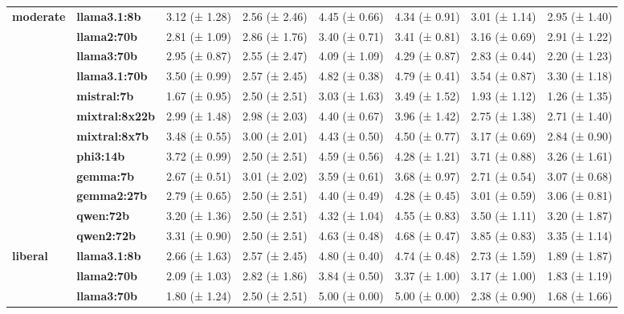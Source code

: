 \begin{longtable}{llllllll}
\cline{1-8}
\multirow[t]{12}{*}{\textbf{moderate}} & \textbf{llama3.1:8b} & 3.12 (± 1.28) & 2.56 (± 2.46) & 4.45 (± 0.66) & 4.34 (± 0.91) & 3.01 (± 1.14) & 2.95 (± 1.40) \\
\textbf{} & \textbf{llama2:70b} & 2.81 (± 1.09) & 2.86 (± 1.76) & 3.40 (± 0.71) & 3.41 (± 0.81) & 3.16 (± 0.69) & 2.91 (± 1.22) \\
\textbf{} & \textbf{llama3:70b} & 2.95 (± 0.87) & 2.55 (± 2.47) & 4.09 (± 1.09) & 4.29 (± 0.87) & 2.83 (± 0.44) & 2.20 (± 1.23) \\
\textbf{} & \textbf{llama3.1:70b} & 3.50 (± 0.99) & 2.57 (± 2.45) & 4.82 (± 0.38) & 4.79 (± 0.41) & 3.54 (± 0.87) & 3.30 (± 1.18) \\
\textbf{} & \textbf{mistral:7b} & 1.67 (± 0.95) & 2.50 (± 2.51) & 3.03 (± 1.63) & 3.49 (± 1.52) & 1.93 (± 1.12) & 1.26 (± 1.35) \\
\textbf{} & \textbf{mixtral:8x22b} & 2.99 (± 1.48) & 2.98 (± 2.03) & 4.40 (± 0.67) & 3.96 (± 1.42) & 2.75 (± 1.38) & 2.71 (± 1.40) \\
\textbf{} & \textbf{mixtral:8x7b} & 3.48 (± 0.55) & 3.00 (± 2.01) & 4.43 (± 0.50) & 4.50 (± 0.77) & 3.17 (± 0.69) & 2.84 (± 0.90) \\
\textbf{} & \textbf{phi3:14b} & 3.72 (± 0.99) & 2.50 (± 2.51) & 4.59 (± 0.56) & 4.28 (± 1.21) & 3.71 (± 0.88) & 3.26 (± 1.61) \\
\textbf{} & \textbf{gemma:7b} & 2.67 (± 0.51) & 3.01 (± 2.02) & 3.59 (± 0.61) & 3.68 (± 0.97) & 2.71 (± 0.54) & 3.07 (± 0.68) \\
\textbf{} & \textbf{gemma2:27b} & 2.79 (± 0.65) & 2.50 (± 2.51) & 4.40 (± 0.49) & 4.28 (± 0.45) & 3.01 (± 0.59) & 3.06 (± 0.81) \\
\textbf{} & \textbf{qwen:72b} & 3.20 (± 1.36) & 2.50 (± 2.51) & 4.32 (± 1.04) & 4.55 (± 0.83) & 3.50 (± 1.11) & 3.20 (± 1.87) \\
\textbf{} & \textbf{qwen2:72b} & 3.31 (± 0.90) & 2.50 (± 2.51) & 4.63 (± 0.48) & 4.68 (± 0.47) & 3.85 (± 0.83) & 3.35 (± 1.14) \\
\cline{1-8}
\multirow[t]{12}{*}{\textbf{liberal}} & \textbf{llama3.1:8b} & 2.66 (± 1.63) & 2.57 (± 2.45) & 4.80 (± 0.40) & 4.74 (± 0.48) & 2.73 (± 1.59) & 1.89 (± 1.87) \\
\textbf{} & \textbf{llama2:70b} & 2.09 (± 1.03) & 2.82 (± 1.86) & 3.84 (± 0.50) & 3.37 (± 1.00) & 3.17 (± 1.00) & 1.83 (± 1.19) \\
\textbf{} & \textbf{llama3:70b} & 1.80 (± 1.24) & 2.50 (± 2.51) & 5.00 (± 0.00) & 5.00 (± 0.00) & 2.38 (± 0.90) & 1.68 (± 1.66) \\

\end{longtable}
